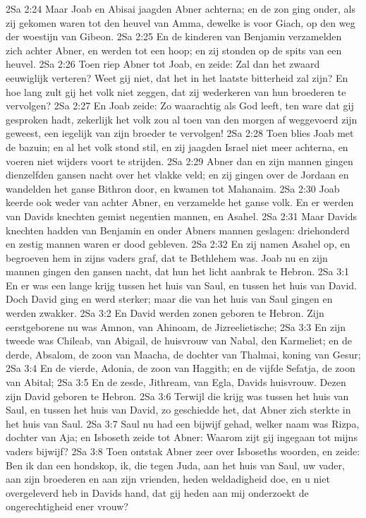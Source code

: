 2Sa 2:24  Maar Joab en Abisai jaagden Abner achterna; en de zon ging onder, als zij gekomen waren tot den heuvel van Amma, dewelke is voor Giach, op den weg der woestijn van Gibeon.
2Sa 2:25  En de kinderen van Benjamin verzamelden zich achter Abner, en werden tot een hoop; en zij stonden op de spits van een heuvel.
2Sa 2:26  Toen riep Abner tot Joab, en zeide: Zal dan het zwaard eeuwiglijk verteren? Weet gij niet, dat het in het laatste bitterheid zal zijn? En hoe lang zult gij het volk niet zeggen, dat zij wederkeren van hun broederen te vervolgen?
2Sa 2:27  En Joab zeide: Zo waarachtig als God leeft, ten ware dat gij gesproken hadt, zekerlijk het volk zou al toen van den morgen af weggevoerd zijn geweest, een iegelijk van zijn broeder te vervolgen!
2Sa 2:28  Toen blies Joab met de bazuin; en al het volk stond stil, en zij jaagden Israel niet meer achterna, en voeren niet wijders voort te strijden.
2Sa 2:29  Abner dan en zijn mannen gingen dienzelfden gansen nacht over het vlakke veld; en zij gingen over de Jordaan en wandelden het ganse Bithron door, en kwamen tot Mahanaim.
2Sa 2:30  Joab keerde ook weder van achter Abner, en verzamelde het ganse volk. En er werden van Davids knechten gemist negentien mannen, en Asahel.
2Sa 2:31  Maar Davids knechten hadden van Benjamin en onder Abners mannen geslagen: driehonderd en zestig mannen waren er dood gebleven.
2Sa 2:32  En zij namen Asahel op, en begroeven hem in zijns vaders graf, dat te Bethlehem was. Joab nu en zijn mannen gingen den gansen nacht, dat hun het licht aanbrak te Hebron.
2Sa 3:1  En er was een lange krijg tussen het huis van Saul, en tussen het huis van David. Doch David ging en werd sterker; maar die van het huis van Saul gingen en werden zwakker.
2Sa 3:2  En David werden zonen geboren te Hebron. Zijn eerstgeborene nu was Amnon, van Ahinoam, de Jizreelietische;
2Sa 3:3  En zijn tweede was Chileab, van Abigail, de huisvrouw van Nabal, den Karmeliet; en de derde, Absalom, de zoon van Maacha, de dochter van Thalmai, koning van Gesur;
2Sa 3:4  En de vierde, Adonia, de zoon van Haggith; en de vijfde Sefatja, de zoon van Abital;
2Sa 3:5  En de zesde, Jithream, van Egla, Davids huisvrouw. Dezen zijn David geboren te Hebron.
2Sa 3:6  Terwijl die krijg was tussen het huis van Saul, en tussen het huis van David, zo geschiedde het, dat Abner zich sterkte in het huis van Saul.
2Sa 3:7  Saul nu had een bijwijf gehad, welker naam was Rizpa, dochter van Aja; en Isboseth zeide tot Abner: Waarom zijt gij ingegaan tot mijns vaders bijwijf?
2Sa 3:8  Toen ontstak Abner zeer over Isboseths woorden, en zeide: Ben ik dan een hondskop, ik, die tegen Juda, aan het huis van Saul, uw vader, aan zijn broederen en aan zijn vrienden, heden weldadigheid doe, en u niet overgeleverd heb in Davids hand, dat gij heden aan mij onderzoekt de ongerechtigheid ener vrouw?
